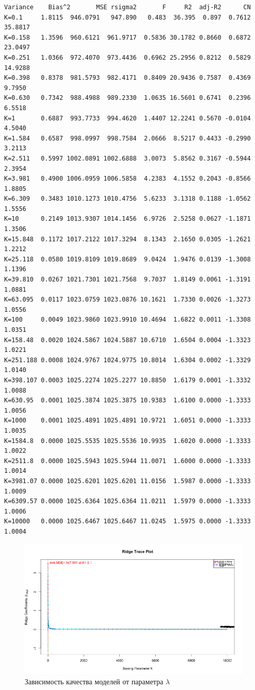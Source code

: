 \documentclass[]{article}
\numberwithin{equation}{section}
\begin{document}
    \begin{lstlisting}[style = TEXTstyle, caption = Сводка по регрессионым моделям]
        Variance    Bias^2       MSE rsigma2       F     R2  adj-R2      CN
K=0.1     1.8115  946.0791   947.890   0.483  36.395  0.897  0.7612 35.8817
K=0.158   1.3596  960.6121  961.9717  0.5836 30.1782 0.8660  0.6872 23.0497
K=0.251   1.0366  972.4070  973.4436  0.6962 25.2956 0.8212  0.5829 14.9288
K=0.398   0.8378  981.5793  982.4171  0.8409 20.9436 0.7587  0.4369  9.7950
K=0.630   0.7342  988.4988  989.2330  1.0635 16.5601 0.6741  0.2396  6.5518
K=1       0.6887  993.7733  994.4620  1.4407 12.2241 0.5670 -0.0104  4.5040
K=1.584   0.6587  998.0997  998.7584  2.0666  8.5217 0.4433 -0.2990  3.2113
K=2.511   0.5997 1002.0891 1002.6888  3.0073  5.8562 0.3167 -0.5944  2.3954
K=3.981   0.4900 1006.0959 1006.5858  4.2383  4.1552 0.2043 -0.8566  1.8805
K=6.309   0.3483 1010.1273 1010.4756  5.6233  3.1318 0.1188 -1.0562  1.5556
K=10      0.2149 1013.9307 1014.1456  6.9726  2.5258 0.0627 -1.1871  1.3506
K=15.848  0.1172 1017.2122 1017.3294  8.1343  2.1650 0.0305 -1.2621  1.2212
K=25.118  0.0580 1019.8109 1019.8689  9.0424  1.9476 0.0139 -1.3008  1.1396
K=39.810  0.0267 1021.7301 1021.7568  9.7037  1.8149 0.0061 -1.3191  1.0881
K=63.095  0.0117 1023.0759 1023.0876 10.1621  1.7330 0.0026 -1.3273  1.0556
K=100     0.0049 1023.9860 1023.9910 10.4694  1.6822 0.0011 -1.3308  1.0351
K=158.48  0.0020 1024.5867 1024.5887 10.6710  1.6504 0.0004 -1.3323  1.0221
K=251.188 0.0008 1024.9767 1024.9775 10.8014  1.6304 0.0002 -1.3329  1.0140
K=398.107 0.0003 1025.2274 1025.2277 10.8850  1.6179 0.0001 -1.3332  1.0088
K=630.95  0.0001 1025.3874 1025.3875 10.9383  1.6100 0.0000 -1.3333  1.0056
K=1000    0.0001 1025.4891 1025.4891 10.9721  1.6051 0.0000 -1.3333  1.0035
K=1584.8  0.0000 1025.5535 1025.5536 10.9935  1.6020 0.0000 -1.3333  1.0022
K=2511.8  0.0000 1025.5943 1025.5944 11.0071  1.6000 0.0000 -1.3333  1.0014
K=3981.07 0.0000 1025.6201 1025.6201 11.0156  1.5987 0.0000 -1.3333  1.0009
K=6309.57 0.0000 1025.6364 1025.6364 11.0211  1.5979 0.0000 -1.3333  1.0006
K=10000   0.0000 1025.6467 1025.6467 11.0245  1.5975 0.0000 -1.3333  1.0004
    \end{lstlisting}

    \begin{figure}[H]
        \centering
        \includegraphics[width = 0.9\linewidth]{data/longley.png}
        \caption{Зависимость качества моделей от параметра $\lambda$}
    \end{figure}
\end{document}
